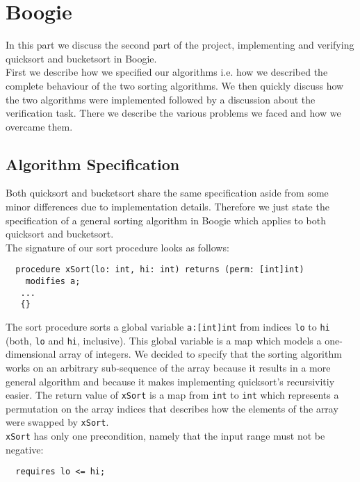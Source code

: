 \section{Boogie}\label{boogie_discussion}

In this part we discuss the second part of the project, implementing and verifying quicksort and bucketsort in Boogie.\\
First we describe how we specified our algorithms i.e. how we described the complete behaviour of the two sorting algorithms. We then quickly discuss how the two algorithms were implemented followed by a discussion about the verification task. There we describe the various problems we faced and how we overcame them.

\subsection{Algorithm Specification}

Both quicksort and bucketsort share the same specification aside from some minor differences due to implementation details. Therefore we just state the specification of a general sorting algorithm in Boogie which 
applies to both quicksort and bucketsort.\\

The signature of our sort procedure looks as follows:

\begin{verbatim}
  procedure xSort(lo: int, hi: int) returns (perm: [int]int)  
    modifies a;
   ...
   {}
 \end{verbatim}

The sort procedure sorts a global variable \texttt{a:[int]int} from indices \texttt{lo} to \texttt{hi} (both, \texttt{lo} and \texttt{hi}, inclusive).
This global variable is a map which models a one-dimensional array of integers. 
We decided to specify that the sorting algorithm works on an arbitrary sub-sequence of the array because it results in a more general algorithm and because it makes implementing quicksort's recursivitiy easier.
The return value of \texttt{xSort} is a map from \texttt{int} to \texttt{int} which represents a permutation on the
array indices that describes how the elements of the array were swapped by \texttt{xSort}.
\\

\texttt{xSort} has only one precondition, namely that the input range must not be negative:
\begin{verbatim}
  requires lo <= hi;
\end{verbatim}


